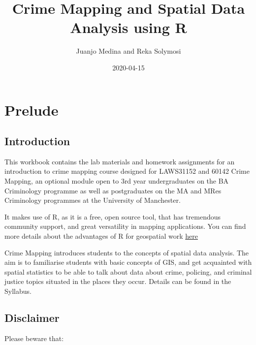 \documentclass[]{book}
\title{Crime Mapping and Spatial Data Analysis using R}
\author{Juanjo Medina and Reka Solymosi}
\date{2020-04-15}
\begin{document}
\maketitle

{
\setcounter{tocdepth}{1}
\tableofcontents
}
\hypertarget{prelude}{%
\chapter*{Prelude}\label{prelude}}

\hypertarget{introduction}{%
\section{Introduction}\label{introduction}}

This workbook contains the lab materials and homework assignments for an introduction to crime mapping course designed for LAWS31152 and 60142 Crime Mapping, an optional module open to 3rd year undergraduates on the BA Criminology programme as well as postgraduates on the MA and MRes Criminology programmes at the University of Manchester.

It makes use of R, as it is a free, open source tool, that has tremendous community support, and great versatility in mapping applications. You can find more details about the advantages of R for geospatial work \href{https://geocompr.robinlovelace.net/intro.html}{here}

Crime Mapping introduces students to the concepts of spatial data analysis. The aim is to familiarise students with basic concepts of GIS, and get acquainted with spatial statistics to be able to talk about data about crime, policing, and criminal justice topics situated in the places they occur. Details can be found in the Syllabus.

\hypertarget{disclaimer}{%
\section{Disclaimer}\label{disclaimer}}

Please beware that:
\end{document}

